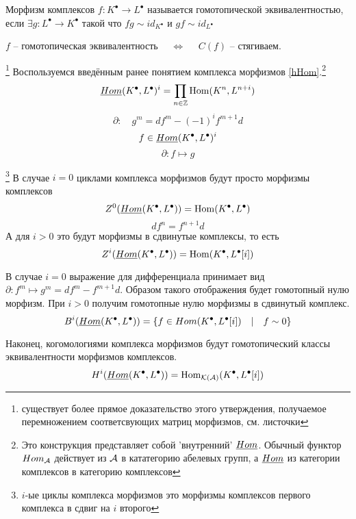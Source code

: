 \documentclass[../main.tex]{subfiles}
\begin{document}
\begin{to_def}
    Морфизм комплексов $f\colon K^\bullet \to L^\bullet$ называется гомотопической эквивалентностью, если $\exists g\colon L^\bullet \to K^\bullet$ такой что $fg \sim id_{K^\bullet}$ и $gf\sim id_{L^\bullet}$
\end{to_def}
\begin{to_suj}
\label{hom_eq_con}
 $f$ -- гомотопическая эквивалентность $\quad \Leftrightarrow \quad$ $C(f)$ -- стягиваем.
\end{to_suj}\footnote{существует более прямое доказательство этого утверждения, получаемое перемножением соответсвующих матриц морфизмов, см. листочки}
    Воспользуемся введённым ранее понятием комплекса морфизмов \ref{hHom}.\footnote{Это конструкция представляет собой 'внутренний' $\underline{Hom}$. Обычный функтор $Hom_{\mathcal{A}}$ действует из $\mathcal{A}$ в кататегорию абелевых групп, а $\underline{Hom}$ из категории комплексов в категорию комплексов} 
    \[\underline{Hom} (K^\bullet, L^\bullet)^{i} = \prod_{n\in \mathbb{Z}}\operatorname{Hom}(K^n, L^{n+i})\]
    \[\partial\colon \quad g^m = df^m - (-1)^if^{m+1}d\]
    \[f\in \underline{Hom}(K^\bullet, L^\bullet)^i\]
    \[\partial\colon f \mapsto g\]
\begin{to_com}\footnote{$i$-ые циклы комплекса морфизмов это морфизмы комплексов первого комплекса в сдвиг на $i$ второго}
    В случае $i=0$ циклами комплекса морфизмов будут просто морфизмы комплексов 
    \[
        Z^0 (\underline{Hom}(K^\bullet, L^\bullet)) = \operatorname{Hom}(K^\bullet, L^\bullet)
    \]
    \[
    df^n = f^{n+1}d
    \]
    А для $i>0$ это будут морфизмы в сдвинутые комплексы, то есть 
    \[
    Z^i (\underline{Hom}(K^\bullet, L^\bullet)) = \operatorname{Hom}(K^\bullet, L^\bullet[i])
    \]
\end{to_com}
\begin{to_com}
    В случае $i=0$ выражение для дифференциала принимает вид $\partial\colon f^m\mapsto g^m = df^m - f^{m+1}d$. Образом такого отображения будет гомотопный нулю морфизм. При $i>0$ получим гомотопные нулю морфизмы в сдвинутый комплекс.
    \[
        B^i (\underline{Hom}(K^\bullet, L^\bullet)) = \lbrace f\in Hom(K^\bullet, L^\bullet[i])\quad|\quad f\sim 0 \rbrace
    \]
\end{to_com}
\begin{to_com}\label{cohomology_comp_mor}
Наконец, когомологиями комплекса морфизмов будут гомотопический классы эквивалентности морфизмов комплексов.
\[
H^i (\underline{Hom}(K^\bullet, L^\bullet)) = \operatorname{Hom}_{\mathcal{K(A)}}(K^\bullet, L^\bullet[i])
\]
\end{to_com}
\end{document}
